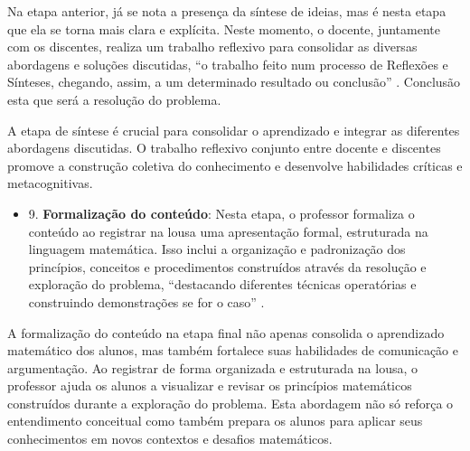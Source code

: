 Na etapa anterior, já se nota a presença da síntese de ideias, mas é nesta etapa que ela se torna mais clara e explícita. Neste momento, o docente, juntamente com os discentes, realiza um trabalho reflexivo para consolidar as diversas abordagens e soluções discutidas, ``o trabalho feito num processo de Reflexões e Sínteses, chegando, assim, a um determinado resultado ou conclusão'' \cite[p. 375]{ANDRADE2017}. Conclusão esta que será a resolução do problema.

A etapa de síntese é crucial para consolidar o aprendizado e integrar as diferentes abordagens discutidas. O trabalho reflexivo conjunto entre docente e discentes promove a construção coletiva do conhecimento e desenvolve habilidades críticas e metacognitivas.


\begin{itemize}
    \item 9. \textbf{Formalização do conteúdo}: Nesta etapa, o professor formaliza o conteúdo ao registrar na lousa uma apresentação formal, estruturada na linguagem matemática. Isso inclui a organização e padronização dos princípios, conceitos e procedimentos construídos através da resolução e exploração do problema, ``destacando diferentes técnicas operatórias e construindo demonstrações se for o caso'' \cite[p. 46]{resolucaoDeProblemas2019}.
\end{itemize}

A formalização do conteúdo na etapa final não apenas consolida o aprendizado matemático dos alunos, mas também fortalece suas habilidades de comunicação e argumentação. Ao registrar de forma organizada e estruturada na lousa, o professor ajuda os alunos a visualizar e revisar os princípios matemáticos construídos durante a exploração do problema. Esta abordagem não só reforça o entendimento conceitual como também prepara os alunos para aplicar seus conhecimentos em novos contextos e desafios matemáticos.


